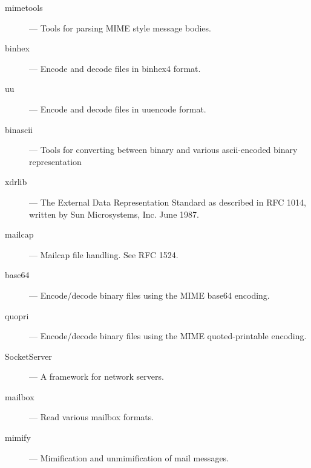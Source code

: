 \begin{description}
\item[mimetools]
--- Tools for parsing MIME style message bodies.

\item[binhex]
--- Encode and decode files in binhex4 format.

\item[uu]
--- Encode and decode files in uuencode format.

\item[binascii]
--- Tools for converting between binary and various ascii-encoded binary 
representation

\item[xdrlib]
--- The External Data Representation Standard as described in RFC 1014,
written by Sun Microsystems, Inc. June 1987.

\item[mailcap]
--- Mailcap file handling.  See RFC 1524.

\item[base64]
--- Encode/decode binary files using the MIME base64 encoding.

\item[quopri]
--- Encode/decode binary files using the MIME quoted-printable encoding.

\item[SocketServer]
--- A framework for network servers.

\item[mailbox]
--- Read various mailbox formats.

\item[mimify]
--- Mimification and unmimification of mail messages.

\end{description}
